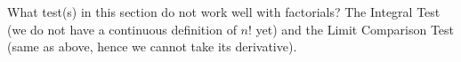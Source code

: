 {What test(s) in this section do not work well with factorials?
}
{The Integral Test (we do not have a continuous definition of $n!$ yet) and the Limit Comparison Test (same as above, hence we cannot take its derivative).
}